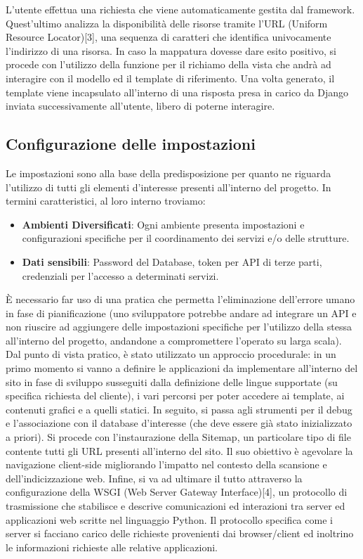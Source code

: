 L'utente effettua una richiesta che viene automaticamente gestita dal framework. Quest'ultimo analizza la disponibilità delle risorse tramite l'URL (Uniform Resource Locator)[3], una sequenza di caratteri che identifica univocamente l'indirizzo di una risorsa. In caso la mappatura dovesse dare esito positivo, si procede con l'utilizzo della funzione per il richiamo della vista che andrà ad interagire con il modello ed il template di riferimento. Una volta generato, il template viene incapsulato all'interno di una risposta presa in carico da Django inviata successivamente all'utente, libero di poterne interagire.

\clearpage

\subsection{Configurazione delle impostazioni}
Le impostazioni sono alla base della predisposizione per quanto ne riguarda l'utilizzo di tutti gli elementi d'interesse presenti all'interno del progetto. \hfill \break
In termini caratteristici, al loro interno troviamo:
\begin{itemize}
    \item \textbf{Ambienti Diversificati}: Ogni ambiente presenta impostazioni e configurazioni specifiche per il coordinamento dei servizi e/o delle strutture.
    \item \textbf{Dati sensibili}: Password del Database, token per API di terze parti, credenziali per l'accesso a determinati servizi.
\end{itemize}

È necessario far uso di una pratica che permetta l'eliminazione dell'errore umano in fase di pianificazione (uno sviluppatore potrebbe andare ad integrare un API e non riuscire ad aggiungere delle impostazioni specifiche per l'utilizzo della stessa all'interno del progetto, andandone a compromettere l'operato su larga scala). 
Dal punto di vista pratico, è stato utilizzato un approccio procedurale: in un primo momento si vanno a definire le applicazioni da implementare all'interno del sito in fase di sviluppo susseguiti dalla definizione delle lingue supportate (su specifica richiesta del cliente), i vari percorsi per poter accedere ai template, ai contenuti grafici e a quelli statici. 
In seguito, si passa agli strumenti per il debug e l'associazione con il database d'interesse (che deve essere già stato inizializzato a priori). 
Si procede con l'instaurazione della Sitemap, un particolare tipo di file contente tutti gli URL presenti all'interno del sito. Il suo obiettivo è agevolare la navigazione client-side migliorando l'impatto nel contesto della scansione e dell'indicizzazione web.
Infine, si va ad ultimare il tutto attraverso la configurazione della WSGI (Web Server Gateway Interface)[4], un protocollo di trasmissione che stabilisce e descrive comunicazioni ed interazioni tra server ed applicazioni web scritte nel linguaggio Python. Il protocollo specifica come i server si facciano carico delle richieste provenienti dai browser/client ed inoltrino le informazioni richieste alle relative applicazioni.


